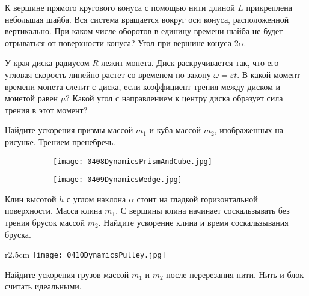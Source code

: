 \AddProb К вершине прямого кругового конуса с помощью нити длиной $L$ прикреплена небольшая шайба. 
Вся система вращается вокруг оси конуса, расположенной вертикально. 
При каком числе оборотов в единицу времени шайба не будет отрываться от поверхности конуса? Угол при вершине конуса $2\alpha$.

\AddProb У края диска радиусом $R$ лежит монета. Диск раскручивается так, 
что его угловая скорость линейно растет со временем по закону $\omega = \varepsilon t$. 
В какой момент времени монета слетит с диска, если коэффициент трения между диском и монетой равен $\mu$? 
Какой угол с направлением к центру диска образует сила трения в этот момент?

\AddProb Найдите ускорения призмы массой $m_1$ и куба массой $m_2$, изображенных на рисунке. Трением пренебречь.

\begin{figure}[!h]
	\begin{subfigure}{.5\textwidth}
		\centering
		\texttt{[image: 0408DynamicsPrismAndCube.jpg]}
	\end{subfigure}
	\begin{subfigure}{.5\textwidth}
		\centering
		\texttt{[image: 0409DynamicsWedge.jpg]}
	\end{subfigure}
\end{figure}

\AddProb Клин высотой $h$ с углом наклона $\alpha$ стоит на гладкой горизонтальной поверхности. 
Масса клина $m_1$. С вершины клина начинает соскальзывать без трения брусок массой $m_2$. Найдите ускорение клина и время соскальзывания бруска.

\begin{wrapfigure}{r}{2.5cm}
\texttt{[image: 0410DynamicsPulley.jpg]}
\end{wrapfigure}

\AddProb Найдите ускорения грузов массой $m_1$ и $m_2$ после перерезания нити. Нить и блок считать идеальными.
